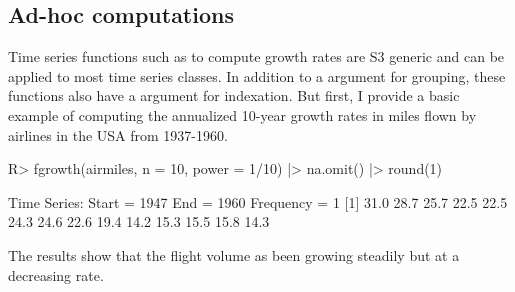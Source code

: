 \documentclass[article]{jss} %
\newcommand{\fct}[1]{\code{#1()}}
\begin{document}
\subsection{Ad-hoc computations}
%
Time series functions such as \fct{fgrowth} to compute growth rates are S3 generic and can be applied to most time series classes. In addition to a  argument for grouping, these functions also have a  argument for indexation. But first, I provide a basic example of computing the annualized 10-year growth rates in miles flown by airlines in the USA from 1937-1960.
%
\begin{Schunk}
\begin{Sinput}
R> fgrowth(airmiles, n = 10, power = 1/10) |> na.omit() |> round(1)
\end{Sinput}
\begin{Soutput}
Time Series:
Start = 1947
End = 1960
Frequency = 1
 [1] 31.0 28.7 25.7 22.5 22.5 24.3 24.6 22.6 19.4 14.2 15.3 15.5 15.8 14.3
\end{Soutput}
\end{Schunk}
%
The results show that the flight volume as been growing steadily but at a decreasing rate. \newline
\end{document}
